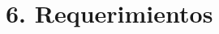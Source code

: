 \documentclass[
11pt, %
]{charter}
\begin{document}
\section{6. Requerimientos}
\label{sec:requerimientos}

%
%
%
%
%
%
\end{document}

